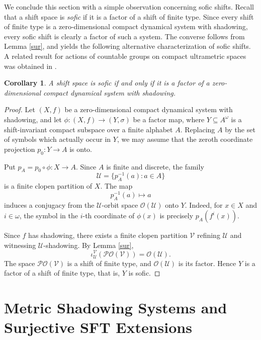 \documentclass[10pt,a4paper]{amsart}
\newtheorem{corollary}[theorem]{Corollary}
\numberwithin{equation}{section}
\begin{document}
We conclude this section with a simple observation concerning sofic shifts.
Recall that a shift space is \emph{sofic} if it is a factor of a shift of
finite type. Since every shift of finite type is a zero-dimensional compact
dynamical system with shadowing, every sofic shift is clearly a factor of such
a system. The converse follows from Lemma \ref{sur}, and yields the following
alternative characterization of sofic shifts. A related result for actions of
countable groups on compact ultrametric spaces was obtained in \cite{Dou}.

\begin{corollary}
A shift space is sofic if and only if it is a factor of a zero-dimensional
compact dynamical system with shadowing.
\end{corollary}



\begin{proof}
Let $(X,f)$ be a zero-dimensional compact dynamical system with shadowing, and
let $\phi:(X,f)\to (Y,\sigma)$ be a factor map, where $Y\subseteq A^\omega$ is a
shift-invariant compact subspace over a finite alphabet $A$. Replacing $A$ by
the set of symbols which actually occur in $Y$, we may assume that the zeroth
coordinate projection $p_0:Y\to A$ is onto.

Put $p_A=p_0\circ\phi:X\to A$. Since $A$ is finite and discrete, the family
\[
    \mathcal U=\{p_A^{-1}(a):a\in A\}
\]
is a finite clopen partition of $X$. The map
\[
    p_A^{-1}(a)\longmapsto a
\]
induces a conjugacy from the $\mathcal U$-orbit space $\mathcal O(\mathcal U)$
onto $Y$. Indeed, for $x\in X$ and $i\in\omega$, the symbol in the $i$-th
coordinate of $\phi(x)$ is precisely $p_A(f^i(x))$.

Since $f$ has shadowing, there exists a finite clopen partition $\mathcal V$
refining $\mathcal U$ and witnessing $\mathcal U$-shadowing. By Lemma
\ref{sur},
\[
    \iota_{\mathcal U}^{\mathcal V}(\mathcal{PO}(\mathcal V))
    =
    \mathcal O(\mathcal U).
\]
The space $\mathcal{PO}(\mathcal V)$ is a shift of finite type, and
$\mathcal O(\mathcal U)$ is its factor. Hence $Y$ is a factor of a shift of
finite type, that is, $Y$ is sofic.
\end{proof}



\section{Metric Shadowing Systems and Surjective SFT Extensions}\label{s2}
\end{document}
